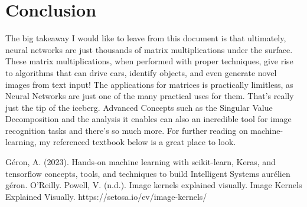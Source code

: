 \documentclass{article}
\begin{document}
\section{Conclusion}
The big takeaway I would like to leave from this document is that ultimately, neural networks are just thousands of matrix multiplications under the surface. These matrix multiplications, when performed with proper techniques, give rise to algorithms that can drive cars, identify objects, and even generate novel images from text input! The applications for matrices is practically limitless, as Neural Networks are just one of the many practical uses for them. That's really just the tip of the iceberg. Advanced Concepts such as the Singular Value Decomposition and the analysis it enables can also an incredible tool for image recognition tasks and there's so much more. For further reading on machine-learning, my referenced textbook below is a great place to look.

\begin{thebibliography}{2}
    
    Géron, A. (2023). Hands-on machine learning with scikit-learn, Keras, and tensorflow concepts, tools, and techniques to build Intelligent Systems aurélien géron. O’Reilly. 
    Powell, V. (n.d.). Image kernels explained visually. Image Kernels Explained Visually. https://setosa.io/ev/image-kernels/ 

\end{thebibliography}
\end{document}
